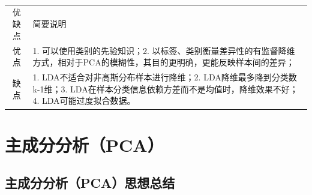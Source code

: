 \begin{longtable}[]{ cl }
\begin{minipage}[b]{0.05\columnwidth}\centering\strut
优缺点\strut
\end{minipage} & \begin{minipage}[b]{0.04\columnwidth}\raggedright\strut
简要说明\strut
\end{minipage}\tabularnewline
\begin{minipage}[t]{0.05\columnwidth}\centering\strut
优点\strut
\end{minipage} & \begin{minipage}[t]{0.04\columnwidth}\raggedright\strut
1. 可以使用类别的先验知识；2.
以标签、类别衡量差异性的有监督降维方式，相对于PCA的模糊性，其目的更明确，更能反映样本间的差异；\strut
\end{minipage}\tabularnewline
\begin{minipage}[t]{0.05\columnwidth}\centering\strut
缺点\strut
\end{minipage} & \begin{minipage}[t]{0.04\columnwidth}\raggedright\strut
1. LDA不适合对非高斯分布样本进行降维；2. LDA降维最多降到分类数k-1维；3.
LDA在样本分类信息依赖方差而不是均值时，降维效果不好；4.
LDA可能过度拟合数据。\strut
\end{minipage}\tabularnewline
\end{longtable}

\section{主成分分析（PCA）}\label{ux4e3bux6210ux5206ux5206ux6790pca}

\subsection{主成分分析（PCA）思想总结}\label{ux4e3bux6210ux5206ux5206ux6790pcaux601dux60f3ux603bux7ed3}

